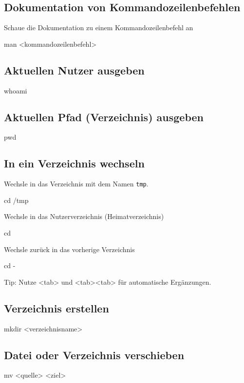 \documentclass[]{article}
\newcommand{\code}[1]{\texttt{#1}}
\begin{document}
\subsection{Dokumentation von Kommandozeilenbefehlen}

Schaue die Dokumentation zu einem Kommandozeilenbefehl an
\begin{bashcode}
man <kommandozeilenbefehl>
\end{bashcode}

\subsection{Aktuellen Nutzer ausgeben}
\begin{bashcode}
whoami
\end{bashcode}

\subsection{Aktuellen Pfad (Verzeichnis) ausgeben}
\begin{bashcode}
pwd
\end{bashcode}

\subsection{In ein Verzeichnis wechseln}
Wechsle in das Verzeichnis mit dem Namen \code{tmp}.
\begin{bashcode}
cd /tmp
\end{bashcode}

Wechsle in das Nutzerverzeichnis (Heimatverzeichnis)
\begin{bashcode}
cd ~
\end{bashcode}

Wechsle zurück in das vorherige Verzeichnis
\begin{bashcode}
cd -
\end{bashcode}

Tip: Nutze <tab> und <tab><tab> für automatische Ergänzungen.

\subsection{Verzeichnis erstellen}
\begin{bashcode}
mkdir <verzeichnisname>
\end{bashcode}

\subsection{Datei oder Verzeichnis verschieben}
\begin{bashcode}
mv <quelle> <ziel>
\end{bashcode}
\end{document}
